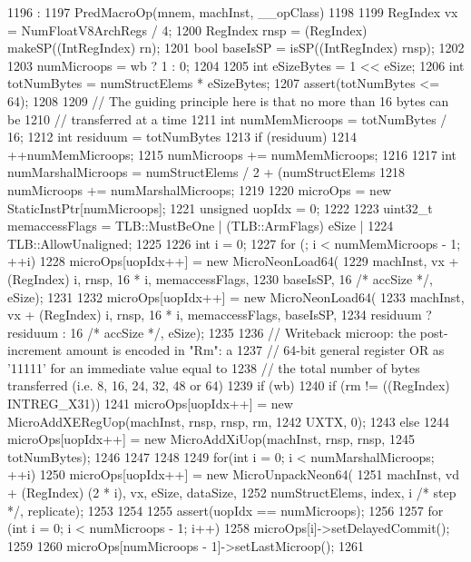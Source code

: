 \begin{DoxyCode}
1196                                              :
1197     PredMacroOp(mnem, machInst, __opClass)
1198 {
1199     RegIndex vx = NumFloatV8ArchRegs / 4;
1200     RegIndex rnsp = (RegIndex) makeSP((IntRegIndex) rn);
1201     bool baseIsSP = isSP((IntRegIndex) rnsp);
1202 
1203     numMicroops = wb ? 1 : 0;
1204 
1205     int eSizeBytes = 1 << eSize;
1206     int totNumBytes = numStructElems * eSizeBytes;
1207     assert(totNumBytes <= 64);
1208 
1209     // The guiding principle here is that no more than 16 bytes can be
1210     // transferred at a time
1211     int numMemMicroops = totNumBytes / 16;
1212     int residuum = totNumBytes %
1213     if (residuum)
1214         ++numMemMicroops;
1215     numMicroops += numMemMicroops;
1216 
1217     int numMarshalMicroops = numStructElems / 2 + (numStructElems %
1218     numMicroops += numMarshalMicroops;
1219 
1220     microOps = new StaticInstPtr[numMicroops];
1221     unsigned uopIdx = 0;
1222 
1223     uint32_t memaccessFlags = TLB::MustBeOne | (TLB::ArmFlags) eSize |
1224         TLB::AllowUnaligned;
1225 
1226     int i = 0;
1227     for (; i < numMemMicroops - 1; ++i) {
1228         microOps[uopIdx++] = new MicroNeonLoad64(
1229             machInst, vx + (RegIndex) i, rnsp, 16 * i, memaccessFlags,
1230             baseIsSP, 16 /* accSize */, eSize);
1231     }
1232     microOps[uopIdx++] = new MicroNeonLoad64(
1233         machInst, vx + (RegIndex) i, rnsp, 16 * i, memaccessFlags, baseIsSP,
1234         residuum ? residuum : 16 /* accSize */, eSize);
1235 
1236     // Writeback microop: the post-increment amount is encoded in "Rm": a
1237     // 64-bit general register OR as '11111' for an immediate value equal to
1238     // the total number of bytes transferred (i.e. 8, 16, 24, 32, 48 or 64)
1239     if (wb) {
1240         if (rm != ((RegIndex) INTREG_X31)) {
1241             microOps[uopIdx++] = new MicroAddXERegUop(machInst, rnsp, rnsp, rm,
1242                                                       UXTX, 0);
1243         } else {
1244             microOps[uopIdx++] = new MicroAddXiUop(machInst, rnsp, rnsp,
1245                                                    totNumBytes);
1246         }
1247     }
1248 
1249     for(int i = 0; i < numMarshalMicroops; ++i) {
1250         microOps[uopIdx++] = new MicroUnpackNeon64(
1251             machInst, vd + (RegIndex) (2 * i), vx, eSize, dataSize,
1252             numStructElems, index, i /* step */, replicate);
1253     }
1254 
1255     assert(uopIdx == numMicroops);
1256 
1257     for (int i = 0; i < numMicroops - 1; i++) {
1258         microOps[i]->setDelayedCommit();
1259     }
1260     microOps[numMicroops - 1]->setLastMicroop();
1261 }

\end{DoxyCode}


